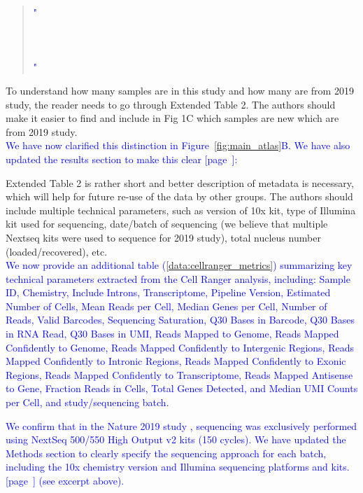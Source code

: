\begin{quote}
	\textcolor{blue}{"\quoteJ\\ \\
	\quoteK\\ \\
	\quoteZ"}
\end{quote}

To understand how many samples are in this study and how many are from 2019 study, the reader needs to go through Extended Table 2. The authors should make it easier to find and include in Fig 1C which samples are new which are from 2019 study.\\
\textcolor{blue}{We have now clarified this distinction in Figure~\ref{fig:main_atlas}B. We have also updated the results section to make this clear [page~\pageref{quoteE-label}]:}

\begin{quote}
	\quoteE
\end{quote}

Extended Table 2 is rather short and better description of metadata is necessary, which will help for future re-use of the data by other groups. The authors should include multiple technical parameters, such as version of 10x kit, type of Illumina kit used for sequencing, date/batch of sequencing (we believe that multiple Nextseq kits were used to sequence for 2019 study), total nucleus number (loaded/recovered), etc.\\
\textcolor{blue}{We now provide an additional table (\ref{data:cellranger_metrics}) summarizing key technical parameters extracted from the Cell Ranger analysis, including: Sample ID, Chemistry, Include Introns, Transcriptome, Pipeline Version, Estimated Number of Cells, Mean Reads per Cell, Median Genes per Cell, Number of Reads, Valid Barcodes, Sequencing Saturation, Q30 Bases in Barcode, Q30 Bases in RNA Read, Q30 Bases in UMI, Reads Mapped to Genome, Reads Mapped Confidently to Genome, Reads Mapped Confidently to Intergenic Regions, Reads Mapped Confidently to Intronic Regions, Reads Mapped Confidently to Exonic Regions, Reads Mapped Confidently to Transcriptome, Reads Mapped Antisense to Gene, Fraction Reads in Cells, Total Genes Detected, and Median UMI Counts per Cell, and study/sequencing batch.}

\textcolor{blue}{We confirm that in the Nature 2019 study \cite{Mathys2019-dl}, sequencing was exclusively performed using NextSeq 500/550 High Output v2 kits (150 cycles). We have updated the Methods section to clearly specify the sequencing approach for each batch, including the 10x chemistry version and Illumina sequencing platforms and kits. [page~\pageref{quoteJ-label}] (see excerpt above).}\\

